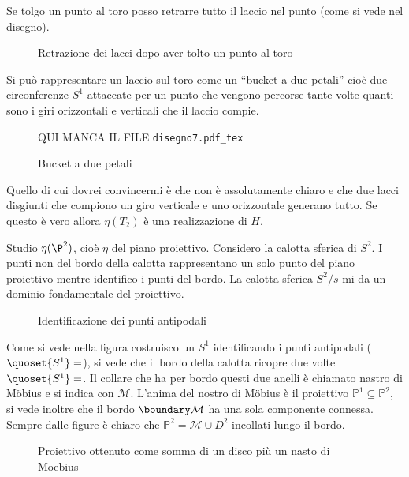 Se tolgo un punto al toro posso retrarre tutto il laccio nel punto (come si vede nel disegno).

\begin{figure}
	\centering 
	
	\caption{Retrazione dei lacci dopo aver tolto un punto al toro}
\end{figure}

Si può rappresentare un laccio sul toro come un ``bucket a due petali'' cioè due circonferenze $S^{1}$ attaccate per un punto che vengono percorse tante volte quanti sono i giri
orizzontali e verticali che il laccio compie.

\begin{figure}
	\centering
	QUI MANCA IL FILE \texttt{disegno7.pdf\_tex}
	\caption{Bucket a due petali}
\end{figure}

Quello di cui dovrei convincermi è che non è assolutamente chiaro e che due lacci disgiunti che compiono un giro verticale e uno orizzontale generano tutto. Se questo è vero allora $\eta(T_{2})$ 
è una realizzazione di $H$.


Studio $\eta(\P^{2})$, cioè $\eta$ del piano proiettivo. Considero la calotta sferica di $S^2$. I punti non del bordo della calotta rappresentano un solo punto del piano proiettivo mentre
identifico i punti del bordo. La calotta sferica $S^{2}/s$ mi da un dominio fondamentale del proiettivo.

\begin{figure}
	\centering 
	
	\caption{Identificazione dei punti antipodali}
\end{figure}

Come si vede nella figura costruisco un $S^1$ identificando i punti antipodali ($\quoset{S^1}=$), si vede che il bordo della calotta ricopre due volte $\quoset{S^1}=$. Il collare che ha per bordo questi due anelli
è chiamato nastro di Möbius e si indica con $\mathcal{M}$. 
L'anima del nostro di Möbius è il proiettivo $\mathbb{P}^1 \subseteq \mathbb{P}^2 $, si vede inoltre che il bordo $\boundary \mathcal{M}$ ha una sola componente connessa.
Sempre dalle figure è chiaro che $\mathbb{P}^2 = \mathcal{M} \cup D^{2}$ incollati lungo il bordo.

\begin{figure}
	\centering 
	
	\caption{Proiettivo ottenuto come somma di un disco più un nasto di Moebius}
\end{figure}

